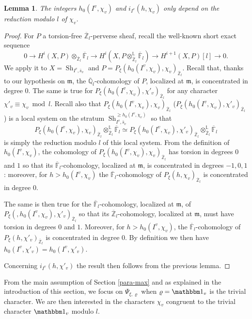\documentclass[JEP,XML,SOM,Unicode,published]{cedram}
\let\mathds\mathbbm
\theoremstyle{plain}
\newtheorem{lemma}[equation]{Lemma}
\theoremstyle{definition}
\numberwithin{equation}{subsection}
\newcommand\Fm{{\mathbb F}}
\newcommand\Qm{{\mathbb Q}}
\newcommand\Zm{{\mathbb Z}}
\newcommand\Lm{{\mathbb L}}
\DeclareMathOperator{\sh}{Sh}
\begin{document}
\begin{lemma} \label{lem-h0I}
The integers $h_0(I^v,\chi_v)$ and $i_{I^v}(h,\chi_v)$ only depend on the reduction modulo $l$ of $\chi_v$.
\end{lemma}

\begin{proof}
For $P$ a torsion-free $\overline \Zm_l$-perverse sheaf,
recall the well-known short exact sequence
\[
0 \to H^i(X,P) \otimes_{\overline \Zm_l} \overline \Fm_l \to
H^i(X,P \otimes^\Lm_{\overline \Zm_l} \overline \Fm_l) \to
H^{i+1}(X,P)[l] \to 0.
\]
We apply it to $X=\sh_{I^v,\bar s_v}$ and $P=P_\xi(h_0(I^v,\chi_v),\chi_{v})_{\overline \Zm_l}$.
Recall that, thanks to our hypothesis on $\mathfrak m$,
the $\overline \Qm_l$-cohomology of $P$, localized at $\mathfrak m$,
is concentrated in degree $0$.
The same is true for $P_\xi(h_0(I^v,\chi_v),\chi'_{v})_{\overline \Zm_l}$ for any character
$\chi'_v \equiv \chi_v \bmod l$. Recall also that $P_\xi(h_0(I^v,\chi_v),\chi_{v})_{\overline \Zm_l}$
(\resp $P_\xi(h_0(I^v,\chi_v),\chi'_{v})_{\overline \Zm_l}$) is a local system on the stratum
$\sh_{I^v,\bar s_v}^{\geq h_0(I^v,\chi_v)}$ so that
\[
P_\xi(h_0(I^v,\chi_v),\chi_{v})_{\overline \Zm_l} \otimes^\Lm_{\overline \Zm_l} \overline \Fm_l
\simeq P_\xi(h_0(I^v,\chi_v),\chi'_{v})_{\overline \Zm_l} \otimes^\Lm_{\overline \Zm_l} \overline \Fm_l
\]
is simply the reduction modulo $l$ of this local system.
From the definition of $h_0(I^v,\chi_v)$, the cohomology of
$P_\xi(h_0(I^v,\chi_v),\chi_{v})_{\overline \Zm_l}$ has torsion in degrees $0$ and $1$
so that its $\overline \Fm_l$-cohomology, localized at $\mathfrak m$, is
concentrated in degrees $-1,0,1$: moreover, for $h> h_0(I^v,\chi_v)$ the
$\overline \Fm_l$-cohomology of $P_\xi(h,\chi_v)_{\overline \Zm_l}$ is concentrated in degree $0$.

The same is then true for the $\overline \Fm_l$-cohomology,
localized at $\mathfrak m$, of $P_\xi(,h_0(I^v,\chi_v),\chi'_{v})_{\overline \Zm_l}$
so that its $\overline \Zm_l$-cohomology, localized at $\mathfrak m$, must have
torsion in degrees $0$ and $1$. Moreover, for $h>h_0(I^v,\chi_v)$,
the $\overline \Fm_l$-cohomology of $P_\xi(h,\chi'_v)_{\overline \Zm_l}$ is concentrated
in degree $0$. By definition we then have $h_0(I^v,\chi'_v)=h_0(I^v,\chi'_v)$.

Concerning $i_{I^v}(h,\chi'_v)$ the result then follows from the previous lemma.
\end{proof}

From the main assumption of Section \ref{para-max} and as explained in the introduction of
this section, we focus on $\Psi_{\xi,\varrho}$ when $\varrho=\mathds 1_v$
is the trivial character. We are then interested in the characters $\chi_v$
congruent to the trivial character $\mathds 1_v$ modulo $l$.
\end{document}
